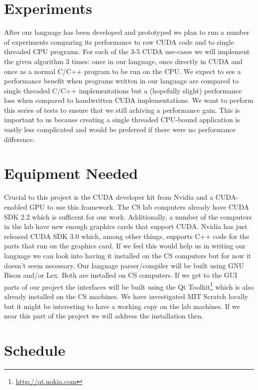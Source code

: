 \documentclass{article}
\begin{document}
\section{Experiments}
\label{sec:experiments}
After our language has been developed and prototyped we plan to run a number of experiments comparing its performance to raw CUDA code and to single threaded CPU programs. For each of the 3-5 CUDA use-cases we will implement the given algorithm 3 times: once in our language, once directly in CUDA and once as a normal C/C++ program to be run on the CPU. We expect to see a performance benefit when programs written in our language are compared to single threaded C/C++ implementations but a (hopefully slight) performance loss when compared to handwritten CUDA implementations. We want to perform this series of tests to ensure that we still achiving a performance gain. This is important to us because creating a single threaded CPU-bound application is vastly less complicated and would be preferred if there were no performance difference.

\section{Equipment Needed}
Crucial to this project is the CUDA developer kit from Nvidia and a CUDA-enabled GPU to use this framework. The CS lab computers already have CUDA SDK 2.2 which is sufficent for our work. Additionally, a number of the computers in the lab have new enough graphics cards that support CUDA. Nvidia has just released CUDA SDK 3.0 which, among other things, supports C++ code for the parts that run on the graphics card. If we feel this would help us in writing our language we can look into having it installed on the CS computers but for now it doesn't seem necessary. Our language parser/compiler will be built using GNU Bison and/or Lex. Both are installed on CS computers. If we get to the GUI parts of our project the interfaces will be built using the Qt Toolkit\footnote{\url{http://qt.nokia.com}} which is also already installed on the CS machines. We have investigated MIT Scratch locally but it might be interesting to have a working copy on the lab machines. If we near this part of the project we will address the installation then.

\section{Schedule}
\label{sec:schedule}
\end{document}
